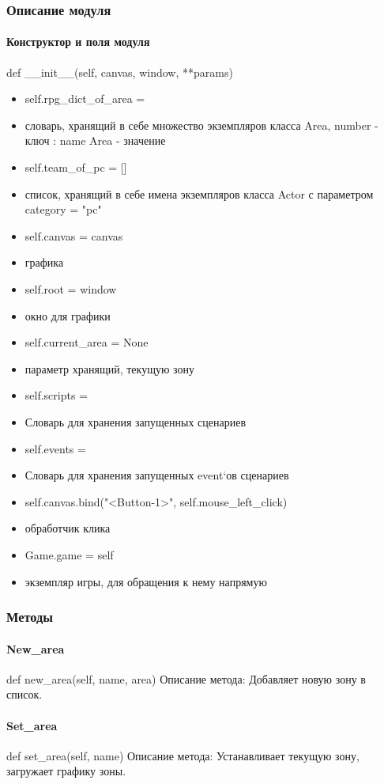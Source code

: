 \subsubsection{Описание модуля}
\paragraph{Конструктор и поля модуля}
def \_\_init\_\_(self,  canvas, window, **params) 
\begin{itemize} 
	\item self.rpg\_dict\_of\_area = {} 
	\item словарь, хранящий в себе множество экземпляров класса Area, {number - ключ : name Area - значение}
	\item self.team\_of\_pc = [] 
	\item список, хранящий в себе имена экземпляров класса Actor с параметром category = "pc"
	\item self.canvas = canvas 
	\item графика
	\item self.root = window 
	\item окно для графики
	\item self.current\_area = None 
	\item параметр хранящий, текущую зону
	\item self.scripts = {}  
	\item Словарь для хранения запущенных сценариев
	\item self.events = {} 
	\item Словарь для хранения запущенных event`ов сценариев
	\item self.canvas.bind("<Button-1>", self.mouse\_left\_click)
	\item обработчик клика
	\item Game.game = self
	\item экземпляр игры, для обращения к нему напрямую
\end{itemize}
\subsubsection{Методы}
\paragraph{New\_area}
def new\_area(self, name, area)
Описание метода: Добавляет новую зону в список.
\paragraph{Set\_area}
def set\_area(self, name)
Описание метода: Устанавливает текущую зону, загружает графику зоны.
